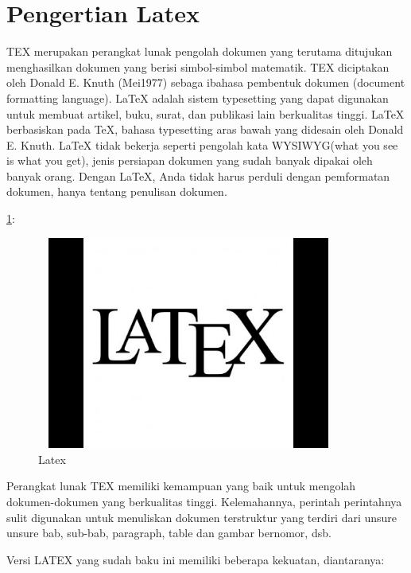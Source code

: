 \section {Pengertian Latex}\par

\vspace{12pt}
TEX merupakan perangkat lunak pengolah dokumen yang terutama ditujukan menghasilkan dokumen yang berisi simbol-simbol matematik. TEX diciptakan oleh Donald E. Knuth (Mei1977) sebaga ibahasa pembentuk dokumen (document formatting language). LaTeX adalah sistem typesetting yang dapat digunakan untuk membuat artikel, buku, surat, dan publikasi lain berkualitas tinggi. LaTeX berbasiskan pada TeX, bahasa typesetting aras bawah yang didesain oleh Donald E. Knuth. LaTeX tidak bekerja seperti pengolah kata WYSIWYG(what you see is what you get), jenis persiapan dokumen yang sudah banyak dipakai oleh banyak orang. Dengan LaTeX, Anda tidak harus perduli dengan pemformatan dokumen, hanya tentang penulisan dokumen.

\ref{latex.jpg}:
\begin{figure}[ht]
	\centerline{\includegraphics[width=10cm,height=7cm]{gambar/latex.jpg}}
	\caption{Latex}
	\label{latex.jpg}
\end{figure}

Perangkat lunak TEX memiliki kemampuan yang baik untuk mengolah dokumen-dokumen yang berkualitas tinggi. Kelemahannya, perintah perintahnya sulit digunakan untuk menuliskan dokumen terstruktur yang terdiri dari unsure unsure bab, sub-bab, paragraph, table dan gambar bernomor, dsb.\par 
\vspace{12pt}

Versi LATEX yang sudah baku ini memiliki beberapa kekuatan, diantaranya:

